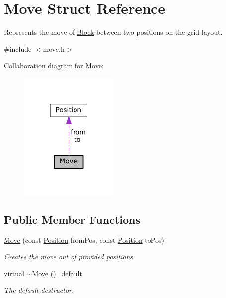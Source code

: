 \hypertarget{struct_move}{}\section{Move Struct Reference}
\label{struct_move}


Represents the move of \mbox{\hyperlink{class_block}{Block}} between two positions on the grid layout.  




{\ttfamily \#include $<$move.\+h$>$}



Collaboration diagram for Move\+:
\nopagebreak
\begin{figure}[H]
\begin{center}
\leavevmode
\includegraphics[width=136pt]{struct_move__coll__graph}
\end{center}
\end{figure}
\subsection*{Public Member Functions}
\begin{DoxyCompactItemize}
\item 
\mbox{\hyperlink{struct_move_aa27facde66c32c5f168c7779108c16a2}{Move}} (const \mbox{\hyperlink{struct_position}{Position}} from\+Pos, const \mbox{\hyperlink{struct_position}{Position}} to\+Pos)
\begin{DoxyCompactList}\small\item\em Creates the move out of provided positions. \end{DoxyCompactList}\item 
virtual \mbox{\hyperlink{struct_move_a6632e48fd18a643a58bf21c6eafc06d7}{$\sim$\+Move}} ()=default
\begin{DoxyCompactList}\small\item\em The default destructor. \end{DoxyCompactList}\end{DoxyCompactItemize}
